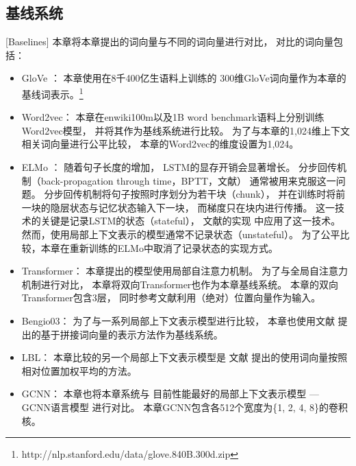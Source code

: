 \subsection{基线系统}[Baselines]
本章将本章提出的词向量与不同的词向量进行对比，
对比的词向量包括：
\begin{itemize}
	\item GloVe \cite{pennington-socher-manning:2014:EMNLP2014}：
	本章使用在8千400亿生语料上训练的
	300维GloVe词向量作为本章的基线词表示。\footnote{http://nlp.stanford.edu/data/glove.840B.300d.zip}
	
	\item Word2vec\cite{NIPS2013_5021}：
	本章在enwiki100m以及1B word benchmark语料上分别训练Word2vec模型，
	并将其作为基线系统进行比较。
	为了与本章的1,024维上下文相关词向量进行公平比较，
	本章的Word2vec的维度设置为1,024。
	
	\item ELMo \cite{peters-EtAl:2018:N18-1}：
	随着句子长度的增加，
	LSTM的显存开销会显著增长。
	分步回传机制（back-propagation through time，BPTT，文献）
	通常被用来克服这一问题。
	分步回传机制将句子按照时序划分为若干块（chunk），
	并在训练时将前一块的隐层状态与记忆状态输入下一块，
	而梯度只在块内进行传播。
	这一技术的关键是记录LSTM的状态（stateful），
	文献的实现
	中应用了这一技术。
	然而，使用局部上下文表示的模型通常不记录状态（unstateful）。
	为了公平比较，本章在重新训练的ELMo中取消了记录状态的实现方式。

	\item Transformer\cite{peters-EtAl:2018:EMNLP}：
本章提出的模型使用局部自注意力机制。
为了与全局自注意力机制进行对比，
本章将双向Transformer也作为本章基线系统。
本章的双向Transformer包含3层，
同时参考文献利用（绝对）位置向量作为输入。

	\item Bengio03\cite{Bengio:2003:NPL:944919.944966}：
	为了与一系列局部上下文表示模型进行比较，
	本章也使用文献
	提出的基于拼接词向量的表示方法作为基线系统。
	
	\item LBL\cite{Mnih:2007:TNG:1273496.1273577}：
	本章比较的另一个局部上下文表示模型是
	文献
	提出的使用词向量按照相对位置加权平均的方法。

	\item GCNN\cite{peters-EtAl:2018:EMNLP}：
	本章也将本章系统与
	目前性能最好的局部上下文表示模型 --- GCNN语言模型
	进行对比。
	本章GCNN包含各512个宽度为\{1, 2, 4, 8\}的卷积核。
\end{itemize}

